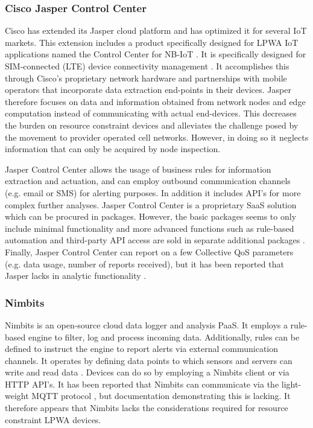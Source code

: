\subsubsection*{Cisco Jasper Control Center}
Cisco has extended its Jasper cloud platform and has optimized it for several IoT markets. This extension includes a product specifically designed for LPWA IoT applications named the Control Center for NB-IoT \cite{cisco_jasper}. It is specifically designed for SIM-connected (LTE) device connectivity management \cite{forrester}. It accomplishes this through Cisco's proprietary network hardware and partnerships with mobile operators that incorporate data extraction end-points in their devices. Jasper therefore focuses on data and information obtained from network nodes and edge computation instead of communicating with actual end-devices. This decreases the burden on resource constraint devices and alleviates the challenge posed by the movement to provider operated cell networks. However, in doing so it neglects information that can only be acquired by node inspection.

Jasper Control Center allows the usage of business rules for information extraction and actuation, and can employ outbound communication channels (e.g. email or SMS) for alerting purposes.  In addition it includes API's for more complex further analyses. Jasper Control Center is a proprietary SaaS solution which can be procured in packages. However, the basic packages seems to only include minimal functionality and more advanced functions such as rule-based automation and third-party API access are sold in separate additional packages \cite{cisco_jasper}. Finally, Jasper Control Center can report on a few Collective QoS parameters (e.g. data usage, number of reports received), but it has been reported that Jasper lacks in analytic functionality \cite{forrester}.

\subsubsection*{Nimbits}
Nimbits \cite{web:nimbits} is an open-source cloud data logger and analysis PaaS. It employs a rule-based engine to filter, log and process incoming data. Additionally, rules can be defined to instruct the engine to report alerts via external communication channels. It operates by defining data points to which sensors and servers can write and read data \cite{study_of_various, nimbits_mqtt}. Devices can do so by employing a Nimbits client or via HTTP API's. It has been reported that Nimbits can communicate via the light-weight MQTT protocol \cite{nimbits_mqtt}, but documentation demonstrating this is lacking. It therefore appears that Nimbits lacks the considerations required for resource constraint LPWA devices.

